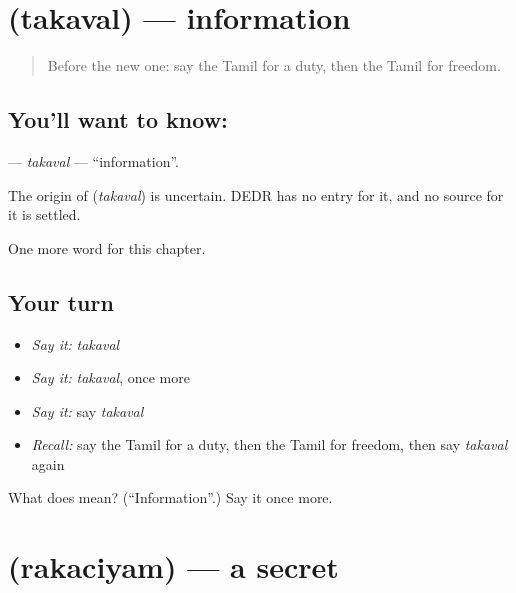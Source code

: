 \section[\texorpdfstring{\ta{தகவல்} (takaval)}{தகவல் (takaval)}]{ (takaval) — information}

\label{lesson:TA-C208-takaval}



\begin{quote}
Before the new one: say the Tamil for a duty, then the Tamil for freedom.
\end{quote}

\subsection*{You'll want to know: }
\textbf{} — \emph{takaval} — \textquotedblleft{}information\textquotedblright{}.

\begin{cousinweb}
The origin of \textbf{} (\emph{takaval}) is uncertain. DEDR has no entry for it, and no source for it is settled.
\end{cousinweb}

\begin{grammarlens}[title={What you've built}]
One more word for this chapter.
\end{grammarlens}

\subsection*{Your turn}
\begin{itemize}
\raggedright
  \item \emph{Say it:} \emph{takaval}
  \item \emph{Say it:} \emph{takaval}, once more
  \item \emph{Say it:} say \emph{takaval}
  \item \emph{Recall:} say the Tamil for a duty, then the Tamil for freedom, then say \emph{takaval} again
\end{itemize}

\begin{tcolorbox}[breakable,colback=teal!4,colframe=teal!35!black,title={Before you move on}]
What does  mean? (\textquotedblleft{}Information\textquotedblright{}.) Say it once more.
\end{tcolorbox}
\section[\texorpdfstring{\ta{ரகசியம்} (rakaciyam)}{ரகசியம் (rakaciyam)}]{ (rakaciyam) — a secret}


